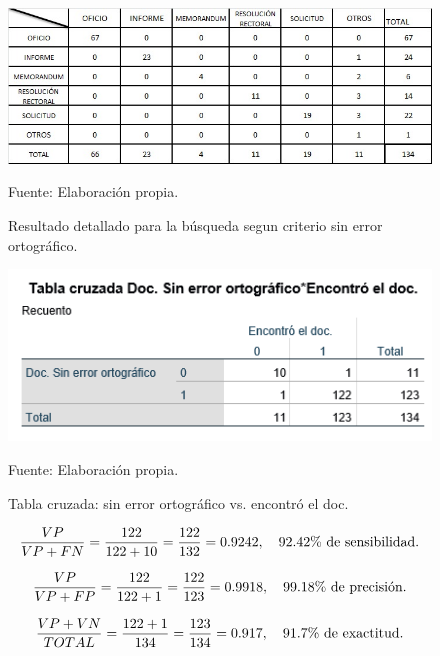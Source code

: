 \begin{figure}[h!]
	\centering
		\includegraphics[scale=0.5]{imagenes/hola123.jpg}
		\caption{Resultado detallado para la búsqueda segun criterio sin error ortográfico.}
		\begin{center}
    Fuente: Elaboración propia.
    \end{center}
	\label{fig:hola123}
\end{figure}
\newpage
\begin{figure}[h!]
	\centering
		\includegraphics[scale=0.7]{imagenes/tablacruSEED.png}
		\caption{Tabla cruzada: sin error ortográfico vs. encontró el doc.}
		\begin{center}
    Fuente: Elaboración propia.
    \end{center}
	\label{fig:tablacruSEED}
\end{figure}

\begin{equation}
\frac{VP}{VP + FN} = \frac{122}{122 + 10} = \frac{122}{132}= 0.9242, \ \ \ 92.42\% \ \textup{de sensibilidad.}
\end{equation}

\begin{equation}
\frac{VP}{VP + FP} = \frac{122}{122 + 1} = \frac{122}{123}= 0.9918, \ \ \ 99.18\% \ \textup{de precisión.}
\end{equation}

\begin{equation}
\frac{VP + VN}{TOTAL} = \frac{122 + 1}{134} = \frac{123}{134}= 0.917, \ \ \ 91.7\% \ \textup{de exactitud.}
\end{equation}

